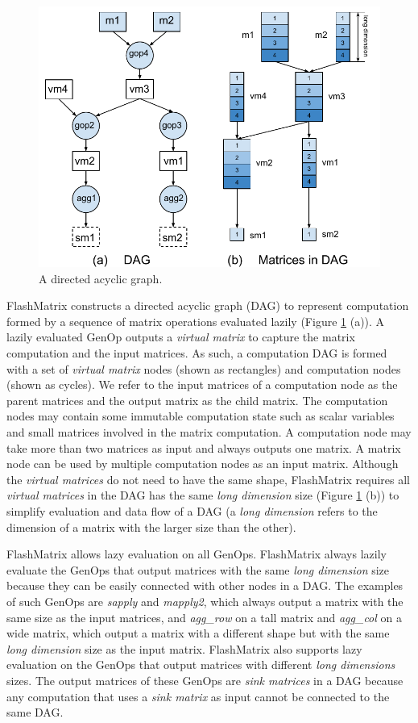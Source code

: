 \begin{figure}
	\centering
	\includegraphics[scale=0.7]{./DAG.pdf}
	\caption{A directed acyclic graph.}
	\label{fig:DAG}
\end{figure}

FlashMatrix constructs a directed acyclic graph (DAG) \cite{} to represent
computation formed by a sequence of matrix operations evaluated lazily
(Figure \ref{fig:DAG} (a)). A lazily evaluated GenOp outputs a \textit{virtual matrix}
to capture the matrix computation and the input matrices. As such, a computation
DAG is formed with a set of \textit{virtual matrix} nodes (shown as rectangles)
and computation nodes (shown as cycles). We refer to the input matrices of
a computation node as the parent matrices and the output matrix as the child
matrix.
The computation nodes may contain some immutable computation state such as
scalar variables and small matrices involved in the matrix computation.
A computation node may take more than two matrices as input and always outputs
one matrix. A matrix node can be used by multiple computation nodes as
an input matrix. Although the \textit{virtual matrices} do not need to have
the same shape, FlashMatrix requires all \textit{virtual matrices} in the DAG
has the same \textit{long dimension} size (Figure \ref{fig:DAG} (b)) to
simplify evaluation and data flow of a DAG (a \textit{long dimension}
refers to the dimension of a matrix with the larger size than the other).

FlashMatrix allows lazy evaluation on all GenOps.
FlashMatrix always lazily evaluate the GenOps that output matrices with
the same \textit{long dimension} size because they can be easily connected
with other nodes in a DAG. The examples of such GenOps are \textit{sapply}
and \textit{mapply2}, which always output a matrix with the same size as
the input matrices, and \textit{agg\_row} on a tall matrix and \textit{agg\_col}
on a wide matrix, which output a matrix with a different shape but with
the same \textit{long dimension} size as the input matrix. FlashMatrix also
supports lazy evaluation on the GenOps that output matrices with different
\textit{long dimensions} sizes. The output matrices of these GenOps are
\textit{sink matrices} in a DAG because any computation
that uses a \textit{sink matrix} as input cannot be connected to the same DAG.

